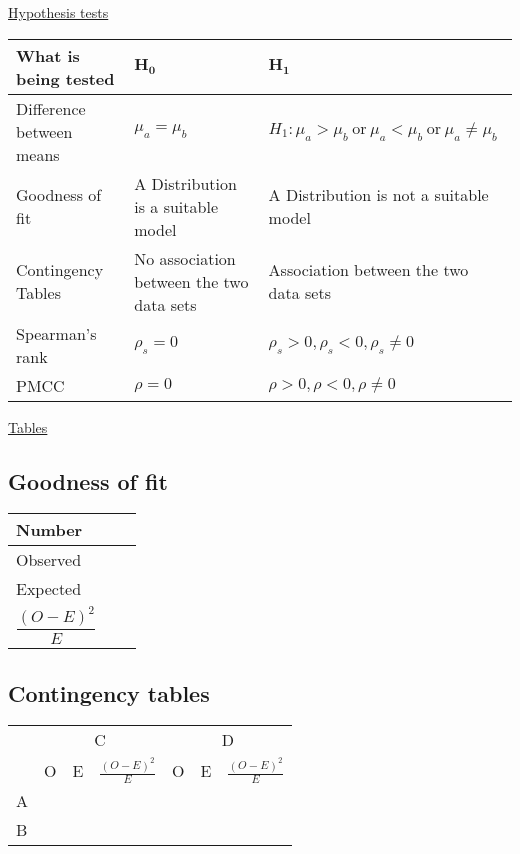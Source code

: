 \documentclass{article}[18pt]
\begin{document}
\newpage
\begin{center}
\underline{\huge Hypothesis tests}
\end{center}
\begin{tabularx}{\textwidth}{|X|X|X|}
\hline
\textbf{What is being tested}&$\mathbf{H_0}$&$\mathbf{H_1}$\\
\hline
Difference between means&$\mu_a=\mu_b$&$H_1:\mu_a>\mu_b \ \textrm{or} \ 
\mu_a<\mu_b \  \textrm{or} \ 
\mu_a\neq\mu_b$\\
\hline
Goodness of fit&A \underline{\hspace{1cm}} Distribution is a suitable model&A \underline{\hspace{1cm}} Distribution is not a suitable model\\
\hline
Contingency Tables&No association between the two data sets&Association between the two data sets\\
\hline
Spearman's rank&$\rho_s=0$&$\rho_s>0,\rho_s<0,\rho_s\neq0$\\
\hline
PMCC&$\rho=0$&$\rho>0,\rho<0,\rho\neq0$\\
\hline
\end{tabularx}
\begin{center}
\underline{\huge Tables}
\end{center}
\setcounter{section}{6}
\subsection{Goodness of fit}
{\renewcommand{\arraystretch}{2}
\begin{tabularx}{\textwidth}{|X|X|X|}
\hline
Number&&\\
\hline
Observed&&\\
\hline
Expected&&\\
\hline
$\dfrac{(O-E)^2}{E}$&&\\
\hline
\end{tabularx}}
\subsection{Contingency tables}
{\renewcommand{\arraystretch}{2}
\begin{tabularx}{\textwidth}{|X|X|X|X|X|X|X|}
\hline
&\multicolumn{3}{|c|}{\centering C}&\multicolumn{3}{|c|}{\centering D}\\
\cline{2-7}
&O&E&$\frac{(O-E)^2}{E}$&O&E&$\frac{(O-E)^2}{E}$\\
\hline
A&&&&&&\\
\hline
B&&&&&&\\
\hline
\end{tabularx}}
\end{document}
